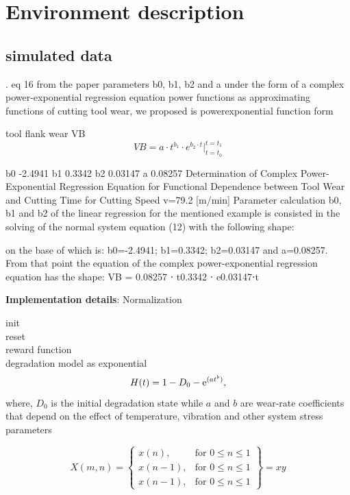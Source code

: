 \documentclass[a4paper, 12pt]{article}
\begin{document}
\section{Environment description}

\subsection{simulated data}
\citep{davsic2006}. eq 16 from the paper 
parameters b0, b1, b2 and a under the form of a
complex power-exponential regression equation
power functions as approximating
functions of cutting tool wear, we proposed is powerexponential
function form

tool
flank wear VB
\[ VB = a \cdot t^{b_1} \cdot e^{b_2 \cdot t} \Big|_{t=t_0}^{t=t_1} \]

b0	-2.4941	
b1	0.3342	
b2	0.03147	
a	0.08257	
Determination of Complex Power-
Exponential Regression Equation for
Functional Dependence between Tool Wear
and Cutting Time for
Cutting Speed v=79.2 [m/min]
Parameter calculation b0, b1 and b2 of the linear
regression for the mentioned example is consisted in
the solving of the normal system equation (12) with
the following shape:

on the base of which is: b0=-2.4941; b1=0.3342;
b2=0.03147 and a=0.08257.
From that point the equation of the complex
power-exponential regression equation has the shape:
VB = 0.08257 ⋅ t0.3342 ⋅ e0.03147⋅t


\textbf{Implementation details}: Normalization

init \\
reset \\
reward function \\

degradation model as exponential
\begin{equation}\label{eq:DegradationModel}
	H(t) = 1 - D_0 - {\rm e}^{(at^b)},
\end{equation}
where, $D_0$ is the initial degradation state while $a$ and $b$ are wear-rate coefficients that depend on the effect of temperature, vibration and other system stress parameters


\[
X(m,n) = \left\{\begin{array}{lr}
	x(n), & \text{for } 0\leq n\leq 1\\
	x(n-1), & \text{for } 0\leq n\leq 1\\
	x(n-1), & \text{for } 0\leq n\leq 1
\end{array}\right\} = xy
\]
\end{document}
